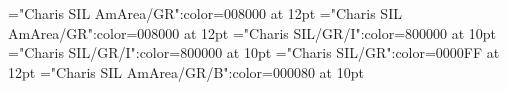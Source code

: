 \documentclass[a4paper,twoside]{article}
\begin{document}
\font\variantentrytypevariantentrytypesvariantformentrybackrefbvariantformentrybackrefsbentryletDatadicBody="Charis SIL AmArea/GR":color=008000 at 12pt
\font\abbreviationvariantentrytypevariantentrytypesvariantformentrybackrefbvariantformentrybackrefsbentryletDatadicBody="Charis SIL AmArea/GR":color=008000 at 12pt
\font\spanesabbreviationvariantentrytypevariantentrytypesvariantformentrybackrefbvariantformentrybackrefsbentryletDatadicBody="Charis SIL/GR/I":color=800000 at 10pt
\font\spanabbreviationvariantentrytypevariantentrytypesvariantformentrybackrefbvariantformentrybackrefsbentryletDatadicBody="Charis SIL/GR/I":color=800000 at 10pt
\font\headwordvariantformentrybackrefbvariantformentrybackrefsbentryletDatadicBody="Charis SIL/GR":color=0000FF at 12pt
\font\spanmxbheadwordvariantformentrybackrefbvariantformentrybackrefsbentryletDatadicBody="Charis SIL AmArea/GR/B":color=000080 at 10pt
\end{document}
